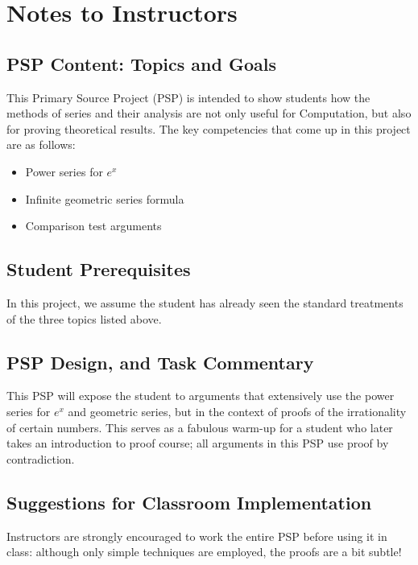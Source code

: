 \documentclass[11pt]{article}
\begin{document}
      
\section*{Notes to Instructors}

\subsection*{PSP Content: Topics and Goals}

This Primary Source Project (PSP) is intended to show students how the methods of series and their analysis are not only useful for Computation, but also for proving theoretical results. The key competencies that come up in this project are as follows:
\begin{itemize}
    \item Power series for $e^x$
    \item Infinite geometric series formula
    \item Comparison test arguments
\end{itemize}


\subsection*{Student Prerequisites}

In this project, we assume the student has already seen the standard treatments of the three topics listed above.
    
\subsection*{PSP Design, and Task Commentary}

This PSP will expose the student to arguments that extensively use the power series for $e^x$ and geometric series, but in the context of proofs of the irrationality of certain numbers.  This serves as a fabulous warm-up for a student who later takes an introduction to proof course; all arguments in this PSP use proof by contradiction.


\subsection*{Suggestions for Classroom Implementation}

Instructors are strongly encouraged to work the entire PSP before using it in class:  although only simple techniques are employed, the proofs are a bit subtle!
\end{document}
